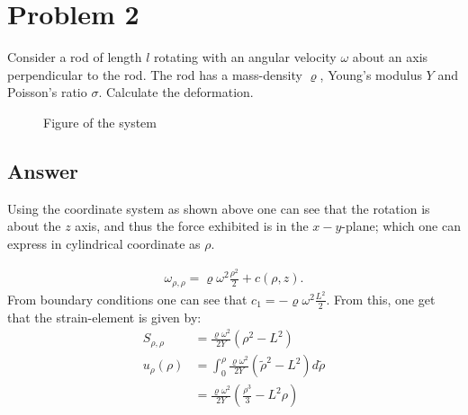 \documentclass{article}
\newcommand{\w}{\omega}
\begin{document}
\section*{Problem 2}
Consider a rod of length $l$ rotating with an angular velocity $\w$ about an axis perpendicular to the rod.
The rod has a mass-density $\varrho$, Young's modulus $Y$  and Poisson's ratio $\sigma$. Calculate the deformation.
\begin{figure}[H]
    \centering
    \caption{Figure of the system}
\end{figure}
\subsection*{Answer}
Using the coordinate system as shown above one can see that the rotation is about the $z$ axis, and thus the force exhibited is in the $x-y$-plane; which one can express in cylindrical coordinate as $\rho$.
\begin{comment}
\begin{align*}
    \bar{\nabla}\left(\text{div}~\mathbf{u}\right) &= -\varrho\w^2 \cdot \frac{(\rho^2 - l^2)}{2Y}\\
\end{align*}
This is then the solution for a rod rotating around an axis perpendicular to the rod, since its only dependent on the distance from the axis of rotation, $\rho$.
\end{comment}
\begin{align*}
    \omega_{\rho, \rho} = \varrho\w^2\frac{\rho^2}{2} +c(\rho, z).
\end{align*}From boundary conditions one can see that $c_1 = - \varrho\w^2\frac{L^2}{2}$. From this, one get that the strain-element is given by:
\begin{align*}
    S_{\rho,\rho} &= \frac{\varrho\w^2}{2Y}(\rho^2 - L^2)\\
    u_\rho(\rho) &= \int_0^\rho\frac{\varrho\w^2}{2Y}(\tilde{\rho}^2 - L^2)d\tilde{\rho}\\
    &= \frac{\varrho\w^2}{2Y}\left(\frac{\rho^3}{3} - L^2\rho\right)\\
\end{align*}
\end{document}
